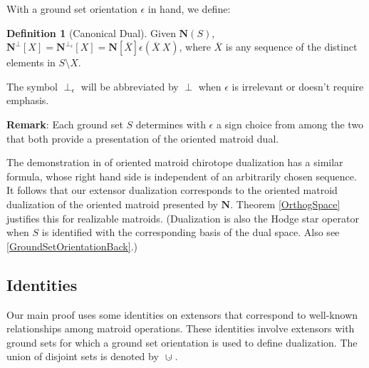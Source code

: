 \documentclass[12pt]{article}
\theoremstyle{definition}
\newtheorem{definition}[theorem]{Definition}
\newcommand{\Remark}{\textbf{Remark}}
\newcommand{\dunion}
{\mbox{\hbox{\hskip6pt$\cdot$\hskip-5.50pt$\cup$\hskip2pt}}}
\newcommand{\scomp}[1]{\ensuremath{\overline{#1}}}
\newcommand{\scma}{\ensuremath{\ }}
\newcommand{\ext}[1]{\ensuremath{\mathbf{#1}}}
\begin{document}
With a ground set orientation $\epsilon$ in hand, we define: 
\begin{definition}[Canonical Dual]
\label{definitionCanonicalDual}
Given $\ext{N}(S)$, 
$\ext{N}^\perp[X] = \ext{N}^{\perp_{\epsilon}}[X]=\ext{N}[\scomp{X}]\epsilon(\scomp{X}\scma X)$, where $\scomp{X}$ is any sequence of the distinct elements
in $S\setminus X$.

The symbol $\perp_{\epsilon}$ will be abbreviated by $\perp$ when 
$\epsilon$ is irrelevant or doesn't require emphasis.
\end{definition}

\Remark:
Each ground set $S$ determines with $\epsilon$ 
a sign choice from among the two 
that both provide a presentation of the
oriented matroid dual.


The demonstration in \cite[end of ]{OMBOOK}
of oriented matroid chirotope dualization 
has a similar formula, whose right hand side is
independent of an arbitrarily chosen sequence.  It follows that 
our extensor dualization corresponds to the oriented
matroid dualization of the oriented matroid presented by
$\ext{N}$.  Theorem \ref{OrthogSpace} justifies this for
realizable matroids.  (Dualization is also the Hodge star 
operator\cite{HodgePedoe1}
when $S$ is identified with the corresponding basis of the dual 
space. Also see \textsection\ref{GroundSetOrientationBack}.)

\subsection{Identities}
\label{IdentitiesSect}

Our main proof uses some identities on extensors 
that correspond to well-known relationships among matroid operations.
These identities involve extensors with ground sets
for which a ground set orientation is used to define dualization.
The union of disjoint sets is denoted by $\dunion$.
\end{document}

